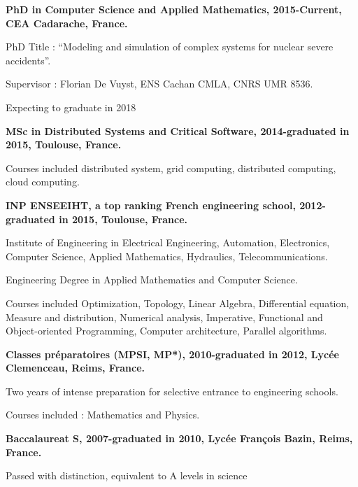\documentclass{article}
\renewenvironment{itemize}{
  \begin{list}{}{
      \setlength{\leftmargin}{1.5em}
      \setlength{\itemsep}{0.25em}
      \setlength{\parskip}{0pt}
      \setlength{\parsep}{0.25em}
    }
}{
  \end{list}
}
\begin{document}
\begin{itemize}
  	\item \textbf{PhD in Computer Science and Applied Mathematics, 2015-Current, CEA Cadarache, France.}
		\begin{itemize}
			\item PhD Title : ``Modeling and simulation of complex systems for nuclear severe accidents''.
			\item Supervisor : Florian De Vuyst, ENS Cachan CMLA, CNRS UMR 8536.
			\item Expecting to graduate in 2018
		\end{itemize}
	\item \textbf{MSc in Distributed Systems and Critical Software, 2014-graduated in 2015, Toulouse, France.}
		\begin{itemize}
			\item Courses included distributed system, grid computing, distributed computing, cloud computing.
		\end{itemize}
    \item \textbf{INP ENSEEIHT, a top ranking French engineering school, 2012-graduated in 2015, Toulouse, France.}
		\begin{itemize}
			\item Institute of Engineering in Electrical Engineering, Automation, Electronics, Computer Science, Applied Mathematics, Hydraulics, Telecommunications.
			\item Engineering Degree in Applied Mathematics and Computer Science.
			\item Courses included Optimization, Topology, Linear Algebra, Differential equation, Measure and distribution, Numerical analysis, Imperative, Functional and Object-oriented Programming, Computer architecture, Parallel algorithms.
		\end{itemize}
	\item \textbf{Classes préparatoires (MPSI, MP*), 2010-graduated in 2012, Lycée Clemenceau, Reims, France.}
		\begin{itemize}
			\item Two years of intense preparation for selective entrance to engineering schools.
			\item Courses included : Mathematics and Physics.
		\end{itemize}
	\item \textbf{Baccalaureat S, 2007-graduated in 2010, Lycée François Bazin, Reims, France.}
		\begin{itemize}
			\item Passed with distinction, equivalent to A levels in science
		\end{itemize}
\end{itemize}
\end{document}
